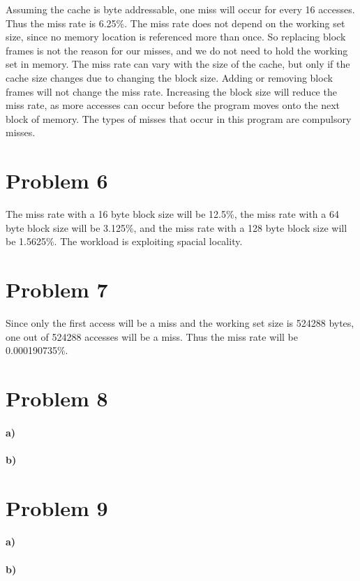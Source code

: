 \documentclass[12pt]{article}
\begin{document}
Assuming the cache is byte addressable, one miss will occur for every 16 accesses. Thus the miss rate is 6.25\%.
The miss rate does not depend on the working set size, since no memory location is referenced more than once. So replacing
block frames is not the reason for our misses, and we do not need to hold the working set in memory. The miss rate can
vary with the size of the cache, but only if the cache size changes due to changing the block size. Adding or removing
block frames will not change the miss rate. Increasing the block size will reduce the miss rate, as more accesses can occur
before the program moves onto the next block of memory. The types of misses that occur in this program are compulsory misses.

\section*{Problem 6}

The miss rate with a 16 byte block size will be 12.5\%, the miss rate with a 64 byte block size will be 3.125\%, and the miss rate with a
128 byte block size will be 1.5625\%. The workload is exploiting spacial locality.

\section*{Problem 7}

Since only the first access will be a miss and the working set size is 524288 bytes, one out of 524288 accesses will be a miss. Thus the
miss rate will be 0.000190735\%.

\section*{Problem 8}

\paragraph{a)}

\paragraph{b)}

\section*{Problem 9}

\paragraph{a)}

\paragraph{b)}
\end{document}
